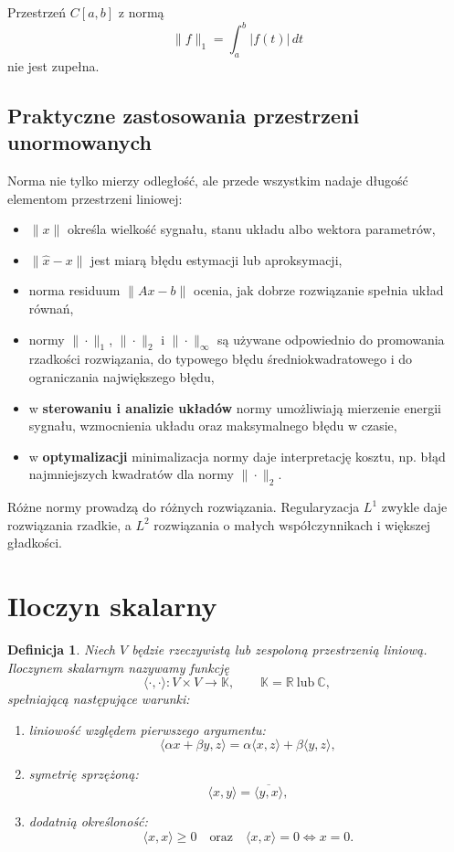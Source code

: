 \documentclass{article}
\newtheorem{definicja}{Definicja}
\begin{document}
Przestrzeń $C[a,b]$ z normą
\[
\|f\|_1=\int_a^b|f(t)|\,dt
\]
nie jest zupełna.

\subsection{Praktyczne zastosowania przestrzeni unormowanych}
Norma nie tylko mierzy odległość, ale przede wszystkim nadaje długość elementom przestrzeni liniowej:
\begin{itemize}
    \item $\|x\|$ określa wielkość sygnału, stanu układu albo wektora parametrów,
    \item $\|\widehat{x}-x\|$ jest miarą błędu estymacji lub aproksymacji,
    \item norma residuum $\|Ax-b\|$ ocenia, jak dobrze rozwiązanie spełnia układ równań,
    \item normy $\|\cdot\|_1$, $\|\cdot\|_2$ i $\|\cdot\|_\infty$ są używane odpowiednio do promowania rzadkości rozwiązania, do typowego błędu średniokwadratowego i do ograniczania największego błędu,
    \item w \textbf{sterowaniu i analizie układów} normy umożliwiają mierzenie energii sygnału, wzmocnienia układu oraz maksymalnego błędu w czasie,
    \item w \textbf{optymalizacji} minimalizacja normy daje interpretację kosztu, np. błąd najmniejszych kwadratów dla normy $\|\cdot\|_2$.
\end{itemize}
Różne normy prowadzą do różnych rozwiązania. Regularyzacja $L^1$ zwykle daje rozwiązania rzadkie, a $L^2$ rozwiązania o małych współczynnikach i większej gładkości.

\section{Iloczyn skalarny}

\begin{definicja}
Niech $V$ będzie rzeczywistą lub zespoloną przestrzenią liniową. Iloczynem skalarnym nazywamy funkcję
\[
\langle\cdot,\cdot\rangle:V\times V\rightarrow\mathbb K,\qquad \mathbb K=\mathbb R\ \text{lub}\ \mathbb C,
\]
spełniającą następujące warunki:
\begin{enumerate}[label=(I\arabic*)]
    \item liniowość względem pierwszego argumentu:
    \[
    \langle\alpha x+\beta y,z\rangle=\alpha\langle x,z\rangle+\beta\langle y,z\rangle,
    \]
    \item symetrię sprzężoną:
    \[
    \langle x,y\rangle=\overline{\langle y,x\rangle},
    \]
    \item dodatnią określoność:
    \[
    \langle x,x\rangle\geq 0
    \quad\text{oraz}\quad
    \langle x,x\rangle=0\iff x=0.
    \]
\end{enumerate}
\end{definicja}
\end{document}

